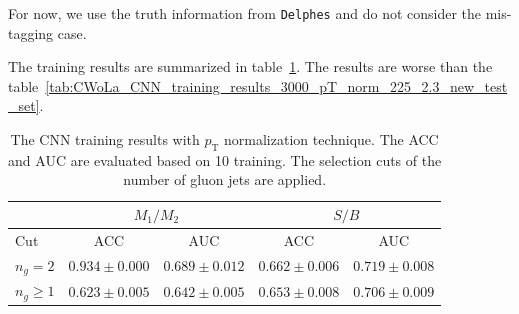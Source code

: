\documentclass[12pt]{article}
\begin{document}
    \begin{table}[htpb]
        \centering
        \caption{The number of events of mixed datasets under different selection cuts.}
        \label{tab:number_of_event_in_mixed_dataset_gluon_jet}
    \end{table}

    For now, we use the truth information from \verb|Delphes| and do not consider the mis-tagging case.

    The training results are summarized in table~\ref{tab:CWoLa_CNN_training_results_3000_pT_norm_gluon_jet}. The results are worse than the table~\ref{tab:CWoLa_CNN_training_results_3000_pT_norm_225_2.3_new_test_set}.
    \begin{table}[htpb]
        \centering
        \caption{The CNN training results with $p_{\text{T}}$ normalization technique. The ACC and AUC are evaluated based on 10 training. The selection cuts of the number of gluon jets are applied.}
        \label{tab:CWoLa_CNN_training_results_3000_pT_norm_gluon_jet}
        \begin{tabular}{l|cc|cc}
                                      & \multicolumn{2}{c|}{$M_1 / M_2$}      & \multicolumn{2}{c}{$S / B$}           \\ \hline
            Cut                       & ACC               & AUC               & ACC               & AUC               \\ \hline
            $n_g = 2$                 & $0.934 \pm 0.000$ & $0.689 \pm 0.012$ & $0.662 \pm 0.006$ & $0.719 \pm 0.008$ \\
            $n_g \ge 1$               & $0.623 \pm 0.005$ & $0.642 \pm 0.005$ & $0.653 \pm 0.008$ & $0.706 \pm 0.009$ \\
        \end{tabular}
    \end{table}


\end{document}
